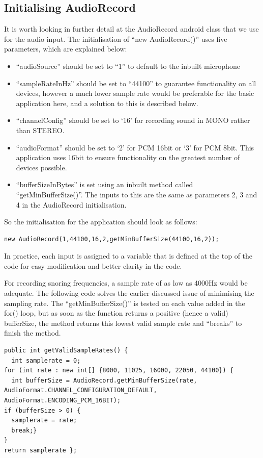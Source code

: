 \subsection{Initialising AudioRecord}
It is worth looking in further detail at the AudioRecord android class that we use for the audio input. The initialisation of ``new AudioRecord()'' uses five parameters, which are explained below:
\begin{itemize}
\item ``audioSource'' should be set to ``1'' to default to the inbuilt microphone
\item ``sampleRateInHz'' should be set to ``44100'' to guarantee functionality on all devices, however a much lower sample rate would be preferable for the basic application here, and a solution to this is described below.
\item ``channelConfig'' should be set to `16' for recording sound in MONO rather than STEREO. 
\item ``audioFormat'' should be set to `2' for PCM 16bit or `3' for PCM 8bit. This application uses 16bit to ensure functionality on the greatest number of devices possible.
\item ``bufferSizeInBytes'' is set using an inbuilt method called ``getMinBufferSize()''. The inputs to this are the same as parameters 2, 3 and 4 in the AudioRecord initialisation.
\end{itemize}
So the initialisation for the application should look as follows:
\begin{lstlisting}
new AudioRecord(1,44100,16,2,getMinBufferSize(44100,16,2));
\end{lstlisting}
In practice, each input is assigned to a variable that is defined at the top of the code for easy modification and better clarity in the code.

 For recording snoring frequencies, a sample rate of as low as 4000Hz would be adequate. The following code solves the earlier discussed issue of minimising the sampling rate. The ``getMinBufferSize()'' is tested on each value added in the for() loop, but as soon as the function returns a positive (hence a valid) bufferSize, the method returns this lowest valid sample rate and ``breaks'' to finish the method.
\begin{lstlisting}
public int getValidSampleRates() {
  int samplerate = 0;
for (int rate : new int[] {8000, 11025, 16000, 22050, 44100}) {
  int bufferSize = AudioRecord.getMinBufferSize(rate, AudioFormat.CHANNEL_CONFIGURATION_DEFAULT, AudioFormat.ENCODING_PCM_16BIT);
if (bufferSize > 0) {
  samplerate = rate;
  break;}
}
return samplerate };
\end{lstlisting}
